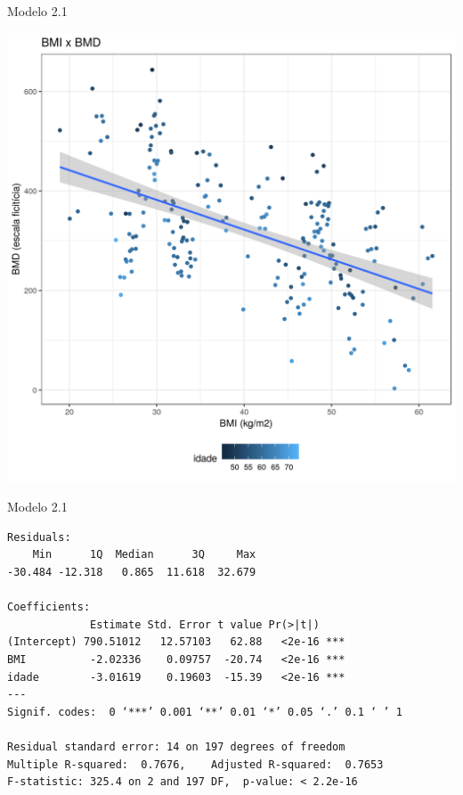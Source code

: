 \documentclass{beamer}
\begin{document}
\begin{frame}{\small Modelo 2.1}
  \begin{center}
    \includegraphics[height=.9\textheight]{Cap31-32/pratica-rlm2_1}
  \end{center}
\end{frame}

\begin{frame}[fragile]{}
  \begin{center}
    \begin{exampleblock}{Modelo 2.1}
      \tiny
\begin{verbatim}
Residuals:
    Min      1Q  Median      3Q     Max 
-30.484 -12.318   0.865  11.618  32.679 

Coefficients:
             Estimate Std. Error t value Pr(>|t|)    
(Intercept) 790.51012   12.57103   62.88   <2e-16 ***
BMI          -2.02336    0.09757  -20.74   <2e-16 ***
idade        -3.01619    0.19603  -15.39   <2e-16 ***
---
Signif. codes:  0 ‘***’ 0.001 ‘**’ 0.01 ‘*’ 0.05 ‘.’ 0.1 ‘ ’ 1

Residual standard error: 14 on 197 degrees of freedom
Multiple R-squared:  0.7676,	Adjusted R-squared:  0.7653 
F-statistic: 325.4 on 2 and 197 DF,  p-value: < 2.2e-16
\end{verbatim}
    \end{exampleblock}
  \end{center}
\end{frame}
\end{document}
